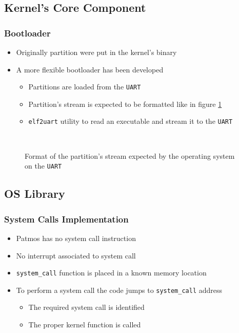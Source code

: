 \documentclass[notheorems]{beamer}
\begin{document}
\subsection{Kernel's Core Component}
\begin{frame}
\frametitle{Bootloader}

\begin{minipage}[c]{.6\textwidth}
\begin{itemize}
	\item Originally partition were put in the kernel's binary
	\item A more flexible bootloader has been developed
		\begin{itemize}
			\item Partitions are loaded from the \texttt{UART}
			\item Partition's stream is expected to be formatted like in figure \ref{fig:partition stream format}
			\item \texttt{elf2uart} utility to read an executable and stream it to the \texttt{UART}
		\end{itemize}
\end{itemize}
\end{minipage}~
\begin{minipage}[c]{.35\textwidth}
	\begin{figure}[!ht]
		\begin{center}
		\end{center}
		\caption{Format of the partition's stream expected by the operating system on the \texttt{UART}}
		\label{fig:partition stream format}
	\end{figure}
\end{minipage}
\end{frame}

\subsection{OS Library}
\begin{frame}
\frametitle{System Calls Implementation}
\begin{itemize}
	\item Patmos has no system call instruction
	\item No interrupt associated to system call
	\item \texttt{system\_call} function is placed in a known memory location
	\item To perform a system call the code jumps to \texttt{system\_call} address
		\begin{itemize}
			\item The required system call is identified
			\item The proper kernel function is called
		\end{itemize}
\end{itemize}
\end{frame}
\end{document}
